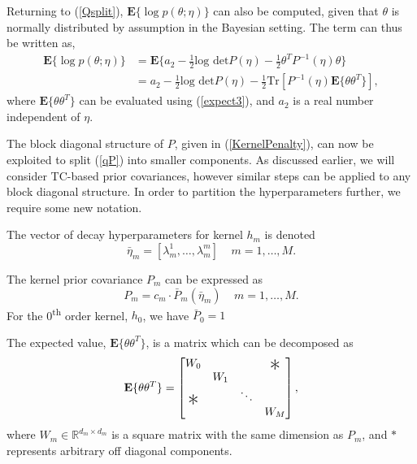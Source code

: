 Returning to (\ref{Qsplit}), $\textbf{E}\{ \log p(\theta; \eta) \}$ can also be computed, given that $\theta$ is normally distributed by assumption in the Bayesian setting. The term can thus be written as,
\begin{align}
\textbf{E}\{ \log p(\theta; \eta) \} &= \textbf{E} \{ a_2 - \frac{1}{2} \text{log det} P(\eta) - \frac{1}{2} \theta^T P^{-1}(\eta) \theta \} \nonumber \\
&= a_2 - \frac{1}{2} \text{log det} P(\eta) - \frac{1}{2} \text{Tr}[ P^{-1}(\eta) \textbf{E}\{ \theta  \theta^T \}], 
\label{qP}
\end{align}
where $\textbf{E}\{ \theta  \theta^T \}$ can be evaluated using (\ref{expect3}), and $a_2$ is a real number independent of $\eta$. 

The block diagonal structure of $P$, given in (\ref{KernelPenalty}), can now be exploited to split (\ref{qP}) into smaller components.  As discussed earlier, we will consider TC-based prior covariances, however similar steps can be applied to any block diagonal structure. In order to partition the hyperparameters further, we require some new notation.

\begin{notation}
\label{not:decayparams}
The vector of decay hyperparameters for kernel $h_m$ is denoted
\begin{equation}
\bar{\eta}_m = [ \lambda_m^1, \hdots, \lambda_m^m] \; \; \; \; m = 1, \hdots, M.
\end{equation}
\end{notation}

\begin{notation}
\label{not:decomposedprior}
The kernel prior covariance $P_m$ can be expressed as
\begin{equation}
P_m = c_m \cdot \bar{P}_m(\bar{\eta}_m) \; \; \; \; m = 1, \hdots, M.
\end{equation}
For the 0\textsuperscript{th} order kernel, $h_0$, we have $\bar{P}_0 = 1$
\end{notation}

\begin{notation}
\label{not:Wmatrix}
The expected value, $\textbf{E} \{ \theta \theta^T\}$, is a matrix which can be decomposed as
\begin{equation}
\textbf{E} \{ \theta \theta^T\} = \begin{bmatrix}
       W_0 & & &  \multirow{2}{*}{\huge *} \\
       & W_1 & & \\
      \multirow{2}{*}{\huge *} & & \ddots & \\
       &  & & W_M
     \end{bmatrix},
\end{equation}
where $W_{m} \in \mathbb{R}^{d_m \times d_m}$ is a square matrix with the same dimension as $P_m$, and $*$ represents arbitrary off diagonal components.
\end{notation}

